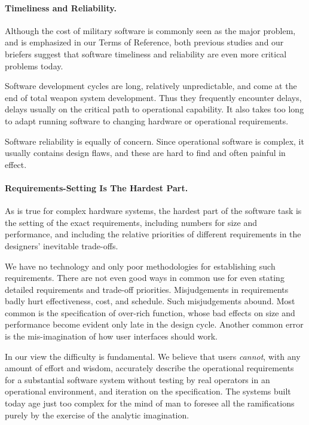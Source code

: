 \documentclass[12pt]{article}
\begin{document}
\paragraph{Timeliness and Reliability.} Although the cost of military software
is commonly seen as the major problem, and is emphasized in our Terms of
Reference, both previous studies and our briefers suggest that software
timeliness and reliability are even more critical problems today.

Software development cycles are long, relatively unpredictable, and come at the
end of total weapon system development. Thus they frequently encounter delays,
delays usually on the critical path to operational capability. It also takes
too long to adapt running software to changing hardware or operational
requirements.

Software reliability is equally of concern. Since operational software is
complex, it usually contains design flaws, and these are hard to find and often
painful in effect.

\paragraph{Requirements-Setting Is The Hardest Part.} As is true for complex
hardware systems, the hardest part of the software task is the setting of the
exact requirements, including numbers for size and performance, and including
the relative priorities of different requirements in the designers' inevitable
trade-offs.

We have no technology and only poor methodologies for establishing such
requirements. There are not even good ways in common use for even stating
detailed requirements and trade-off priorities. Misjudgements in requirements
badly hurt effectiveness, cost, and schedule. Such misjudgements abound. Most
common is the specification of over-rich function, whose bad effects on size
and performance become evident only late in the design cycle. Another common
error is the mis-imagination of how user interfaces should work.

In our view the difficulty is fundamental. We believe that users \emph{cannot},
with any amount of effort and wisdom, accurately describe the operational
requirements for a substantial software system without testing by real
operators in an operational environment, and iteration on the specification.
The systems built today age just too complex for the mind of man to foresee all
the ramifications purely by the exercise of the analytic imagination.
\end{document}
